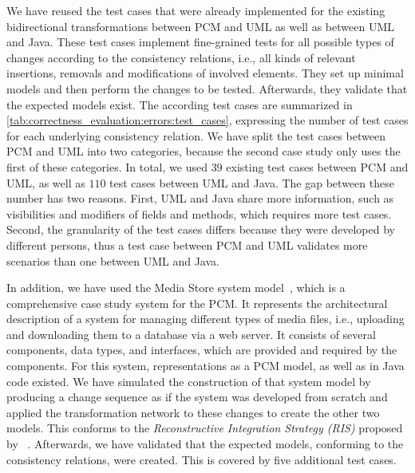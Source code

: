 We have reused the test cases that were already implemented for the existing bidirectional transformations between \gls{PCM} and \gls{UML} as well as between \gls{UML} and Java.
These test cases implement fine-grained tests for all possible types of changes according to the consistency relations, i.e., all kinds of relevant insertions, removals and modifications of involved elements.
They set up minimal models and then perform the changes to be tested.
Afterwards, they validate that the expected models exist.
The according test cases are summarized in \autoref{tab:correctness_evaluation:errors:test_cases}, expressing the number of test cases for each underlying consistency relation.
We have split the test cases between \gls{PCM} and \gls{UML} into two categories, because the second case study only uses the first of these categories.
In total, we used $39$ existing test cases between \gls{PCM} and \gls{UML}, as well as $110$ test cases between \gls{UML} and Java.
The gap between these number has two reasons. First, \gls{UML} and Java share more information, such as visibilities and modifiers of fields and methods, which requires more test cases. Second, the granularity of the test cases differs because they were developed by different persons, thus a test case between \gls{PCM} and \gls{UML} validates more scenarios than one between \gls{UML} and Java.

In addition, we have used the Media Store system model~\cite{strittmatter2016a}, which is a comprehensive case study system for the \gls{PCM}.
It represents the architectural description of a system for managing different types of media files, i.e., uploading and downloading them to a database via a web server.
It consists of several components, data types, and interfaces, which are provided and required by the components.
For this system, representations as a \gls{PCM} model, as well as in Java code existed.
We have simulated the construction of that system model by producing a change sequence as if the system was developed from scratch and applied the transformation network to these changes to create the other two models.
This conforms to the \emph{Reconstructive Integration Strategy (RIS)} proposed by \citeauthor{langhammer2017a}~\cite{langhammer2017a,klare2020Vitruv-JSS}.
Afterwards, we have validated that the expected models, conforming to the consistency relations, were created.
This is covered by five additional test cases.

